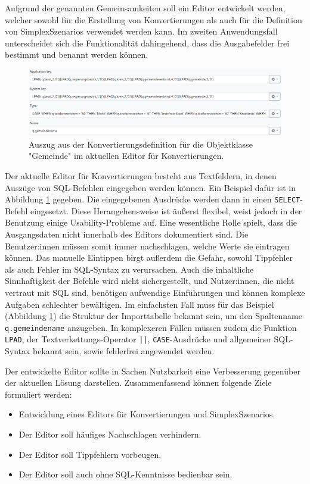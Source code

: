 Aufgrund der genannten Gemeinsamkeiten soll ein Editor entwickelt werden, welcher sowohl für die Erstellung von Konvertierungen als auch für die Definition von SimplexSzenarios verwendet werden kann. Im zweiten Anwendungsfall unterscheidet sich die Funktionalität dahingehend, dass die Ausgabefelder frei bestimmt und benannt werden können.

\begin{figure}[ht]
  \centering
  \includegraphics[width=.95\textwidth]{assets/conversion-gemeinde.png}
  \caption{Auszug aus der Konvertierungsdefinition für die Objektklasse "Gemeinde" im aktuellen Editor für Konvertierungen.}
  \label{fig:conversion-gemeinde}
\end{figure}

Der aktuelle Editor für Konvertierungen besteht aus Textfeldern, in denen Auszüge von \ac{SQL}-Befehlen eingegeben werden können. Ein Beispiel dafür ist in Abbildung \ref{fig:conversion-gemeinde} gegeben. Die eingegebenen Ausdrücke werden dann in einen \texttt{SELECT}-Befehl eingesetzt. Diese Herangehensweise ist äußerst flexibel, weist jedoch in der Benutzung einige Usability-Probleme auf. Eine wesentliche Rolle spielt, dass die Ausgangsdaten nicht innerhalb des Editors dokumentiert sind. Die Benutzer:innen müssen somit immer nachschlagen, welche Werte sie eintragen können. Das manuelle Eintippen birgt außerdem die Gefahr, sowohl Tippfehler als auch Fehler im \ac{SQL}-Syntax zu verursachen. Auch die inhaltliche Sinnhaftigkeit der Befehle wird nicht sichergestellt, und Nutzer:innen, die nicht vertraut mit SQL sind, benötigen aufwendige Einführungen und können komplexe Aufgaben schlechter bewältigen. Im einfachsten Fall muss für das Beispiel (Abbildung \ref{fig:conversion-gemeinde}) die Struktur der Importtabelle bekannt sein, um den Spaltenname \texttt{q.gemeindename} anzugeben. In komplexeren Fällen müssen zudem die Funktion \texttt{LPAD}, der Textverkettungs-Operator \texttt{||}, \texttt{CASE}-Ausdrücke und allgemeiner \ac{SQL}-Syntax bekannt sein, sowie fehlerfrei angewendet werden.

\vspace{\baselineskip}

\noindent
Der entwickelte Editor sollte in Sachen Nutzbarkeit eine Verbesserung gegenüber der aktuellen Lösung darstellen. Zusammenfassend können folgende Ziele formuliert werden:
\begin{itemize}
  \item Entwicklung eines Editors für Konvertierungen und SimplexSzenarios.
  \item Der Editor soll häufiges Nachschlagen verhindern.
  \item Der Editor soll Tippfehlern vorbeugen.
  \item Der Editor soll auch ohne \ac{SQL}-Kenntnisse bedienbar sein.
\end{itemize}
